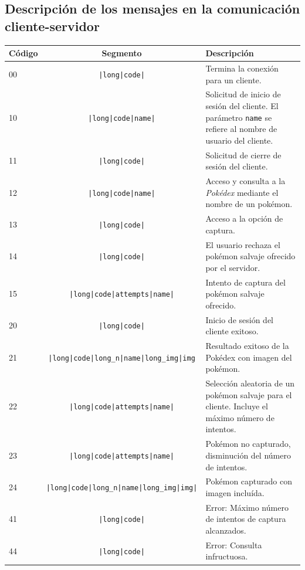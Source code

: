 \documentclass[12pt]{article}
\begin{document}
\subsection{Descripción de los mensajes en la comunicación cliente-servidor}
\begin{center}
  \begin{tabular}{|l|c|p{5.9cm}|}
    \hline
    Código & Segmento & Descripción \\ \hline
    \hline
    00 & \texttt{|long|code|} & Termina la conexión para un cliente. \\ \hline
    10 & \texttt{|long|code|name|} & Solicitud de inicio de sesión del cliente. El parámetro \texttt{name} se refiere al nombre de usuario del cliente. \\ \hline
    11 & \texttt{|long|code|} & Solicitud de cierre de sesión del cliente. \\ \hline
    12 & \texttt{|long|code|name|} & Acceso y consulta a la \textit{Pokédex} mediante el nombre de un pokémon. \\ \hline
    13 & \texttt{|long|code|} & Acceso a la opción de captura. \\ \hline
    14 & \texttt{|long|code|} & El usuario rechaza el pokémon salvaje ofrecido por el servidor. \\ \hline
    15 & \texttt{|long|code|attempts|name|} & Intento de captura del pokémon salvaje ofrecido. \\ \hline %
    \hline
    20 & \texttt{|long|code|} & Inicio de sesión del cliente exitoso. \\ \hline
    21 & \texttt{|long|code|long\_n|name|long\_img|img} & Resultado exitoso de la Pokédex con imagen del pokémon. \\ \hline %
    22 & \texttt{|long|code|attempts|name|} & Selección aleatoria de un pokémon salvaje para el cliente. Incluye el máximo número de intentos. \\ \hline
    23 & \texttt{|long|code|attempts|name|} & Pokémon no capturado, disminución del número de intentos. \\ \hline
    24 & \texttt{|long|code|long\_n|name|long\_img|img|} & Pokémon capturado con imagen incluída. \\ \hline \hline
    41 & \texttt{|long|code|} & Error: Máximo número de intentos de captura alcanzados. \\ \hline
    44 & \texttt{|long|code|} & Error: Consulta infructuosa. \\ \hline
  \end{tabular}
\end{center}
\end{document}
